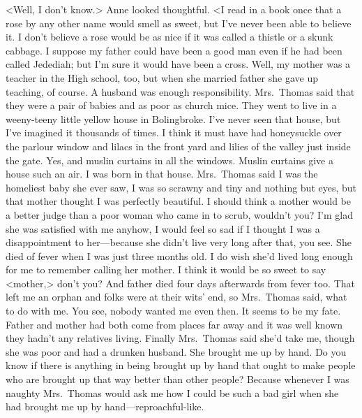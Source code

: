<Well, I don't know.> Anne looked thoughtful. <I read in a book once that a rose by any other name would smell as sweet, but I've never been able to believe it. I don't believe a rose would be as nice if it was called a thistle or a skunk cabbage. I suppose my father could have been a good man even if he had been called Jedediah; but I'm sure it would have been a cross. Well, my mother was a teacher in the High school, too, but when she married father she gave up teaching, of course. A husband was enough responsibility. Mrs.~Thomas said that they were a pair of babies and as poor as church mice. They went to live in a weeny-teeny little yellow house in Bolingbroke. I've never seen that house, but I've imagined it thousands of times. I think it must have had honeysuckle over the parlour window and lilacs in the front yard and lilies of the valley just inside the gate. Yes, and muslin curtains in all the windows. Muslin curtains give a house such an air. I was born in that house. Mrs.~Thomas said I was the homeliest baby she ever saw, I was so scrawny and tiny and nothing but eyes, but that mother thought I was perfectly beautiful. I should think a mother would be a better judge than a poor woman who came in to scrub, wouldn't you? I'm glad she was satisfied with me anyhow, I would feel so sad if I thought I was a disappointment to her—because she didn't live very long after that, you see. She died of fever when I was just three months old. I do wish she'd lived long enough for me to remember calling her mother. I think it would be so sweet to say <mother,> don't you? And father died four days afterwards from fever too. That left me an orphan and folks were at their wits' end, so Mrs.~Thomas said, what to do with me. You see, nobody wanted me even then. It seems to be my fate. Father and mother had both come from places far away and it was well known they hadn't any relatives living. Finally Mrs.~Thomas said she'd take me, though she was poor and had a drunken husband. She brought me up by hand. Do you know if there is anything in being brought up by hand that ought to make people who are brought up that way better than other people? Because whenever I was naughty Mrs.~Thomas would ask me how I could be such a bad girl when she had brought me up by hand—reproachful-like.

